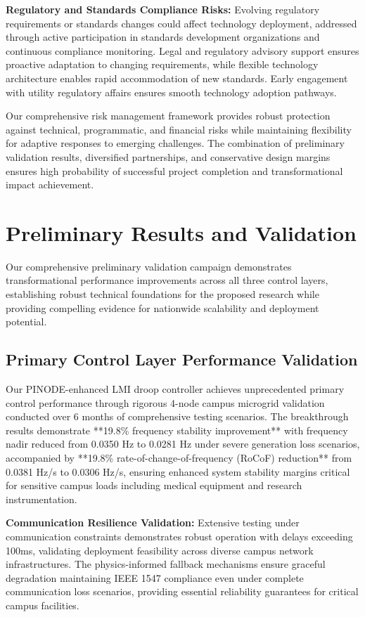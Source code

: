 \documentclass[12pt]{article}
\begin{document}
\textbf{Regulatory and Standards Compliance Risks:} Evolving regulatory requirements or standards changes could affect technology deployment, addressed through active participation in standards development organizations and continuous compliance monitoring. Legal and regulatory advisory support ensures proactive adaptation to changing requirements, while flexible technology architecture enables rapid accommodation of new standards. Early engagement with utility regulatory affairs ensures smooth technology adoption pathways.

Our comprehensive risk management framework provides robust protection against technical, programmatic, and financial risks while maintaining flexibility for adaptive responses to emerging challenges. The combination of preliminary validation results, diversified partnerships, and conservative design margins ensures high probability of successful project completion and transformational impact achievement.

\section{Preliminary Results and Validation}

Our comprehensive preliminary validation campaign demonstrates transformational performance improvements across all three control layers, establishing robust technical foundations for the proposed research while providing compelling evidence for nationwide scalability and deployment potential.

\subsection{Primary Control Layer Performance Validation}

Our PINODE-enhanced LMI droop controller achieves unprecedented primary control performance through rigorous 4-node campus microgrid validation conducted over 6 months of comprehensive testing scenarios. The breakthrough results demonstrate **19.8\% frequency stability improvement** with frequency nadir reduced from 0.0350 Hz to 0.0281 Hz under severe generation loss scenarios, accompanied by **19.8\% rate-of-change-of-frequency (RoCoF) reduction** from 0.0381 Hz/s to 0.0306 Hz/s, ensuring enhanced system stability margins critical for sensitive campus loads including medical equipment and research instrumentation.

\textbf{Communication Resilience Validation:} Extensive testing under communication constraints demonstrates robust operation with delays exceeding 100ms, validating deployment feasibility across diverse campus network infrastructures. The physics-informed fallback mechanisms ensure graceful degradation maintaining IEEE 1547 compliance even under complete communication loss scenarios, providing essential reliability guarantees for critical campus facilities.
\end{document}
